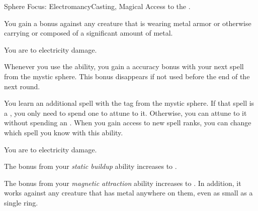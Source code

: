     \begin{feat}{Sphere Focus: Electromancy}{Casting, Magical}
        \featpre Access to the  .

         You gain a   bonus against any creature that is wearing metal armor or otherwise carrying or composed of a significant amount of metal.

         You are  to electricity damage.

         Whenever you use the  ability, you gain a  accuracy bonus with your next spell from the  mystic sphere.
        This bonus disappears if not used before the end of the next round.

         You learn an additional spell with the  tag from the  mystic sphere.
        If that spell is a , you only need to spend one  to attune to it.
        Otherwise, you can attune to it without spending an .
        When you gain access to new spell ranks, you can change which spell you know with this ability.

         You are  to electricity damage.

         The bonus from your \textit{static buildup} ability increases to .

         The bonus from your \textit{magnetic attraction} ability increases to .
        In addition, it works against any creature that has metal anywhere on them, even as small as a single ring.
    \end{feat}

